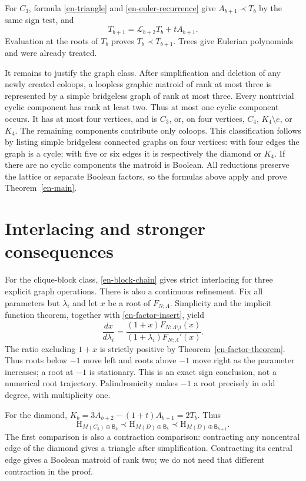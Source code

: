 \documentclass[12pt]{amsart}
\theoremstyle{definition}
\theoremstyle{remark}
\numberwithin{equation}{section}
\newcommand{\HCh}{\mathrm{H}}
\newcommand{\Bmat}{\mathsf{B}}
\newcommand{\Dop}[1]{\mathscr{L}_{#1}}
\begin{document}
For $C_3$, formula \eqref{en-triangle} and \eqref{en-euler-recurrence} give $A_{b+1}\prec T_b$ by the same sign test, and
\[
 T_{b+1}=\Dop{b+2}T_b+tA_{b+1}.
\]
Evaluation at the roots of $T_b$ proves $T_b\prec T_{b+1}$. Trees give Eulerian polynomials and were already treated.

It remains to justify the graph class. After simplification and deletion of any newly created coloops, a loopless graphic matroid of rank at most three is represented by a simple bridgeless graph of rank at most three. Every nontrivial cyclic component has rank at least two. Thus at most one cyclic component occurs. It has at most four vertices, and is $C_3$, or, on four vertices, $C_4$, $K_4\setminus e$, or $K_4$. The remaining components contribute only coloops. This classification follows by listing simple bridgeless connected graphs on four vertices: with four edges the graph is a cycle; with five or six edges it is respectively the diamond or $K_4$. If there are no cyclic components the matroid is Boolean. All reductions preserve the lattice or separate Boolean factors, so the formulas above apply and prove Theorem~\ref{en-main}.

\section{Interlacing and stronger consequences}

For the clique-block class, \eqref{en-block-chain} gives strict interlacing for three explicit graph operations. There is also a continuous refinement. Fix all parameters but $\lambda_i$ and let $x$ be a root of $F_{N;\Lambda}$. Simplicity and the implicit function theorem, together with \eqref{en-factor-insert}, yield
\begin{equation}\label{en-factor-motion}
 \frac{dx}{d\lambda_i}
 =\frac{(1+x)F_{N;\Lambda\setminus i}(x)}
        {(1+\lambda_i)F_{N;\Lambda}'(x)}.
\end{equation}
The ratio excluding $1+x$ is strictly positive by Theorem~\ref{en-factor-theorem}. Thus roots below $-1$ move left and roots above $-1$ move right as the parameter increases; a root at $-1$ is stationary. This is an exact sign conclusion, not a numerical root trajectory. Palindromicity makes $-1$ a root precisely in odd degree, with multiplicity one.

For the diamond, $K_b=3A_{b+2}-(1+t)A_{b+1}=2T_b$. Thus
\begin{equation}\label{en-diamond-interlace}
 \HCh_{M(C_3)\oplus\Bmat_b}\prec
 \HCh_{M(D)\oplus\Bmat_b}\prec
 \HCh_{M(D)\oplus\Bmat_{b+1}}.
\end{equation}
The first comparison is also a contraction comparison: contracting any noncentral edge of the diamond gives a triangle after simplification. Contracting its central edge gives a Boolean matroid of rank two; we do not need that different contraction in the proof.
\end{document}
